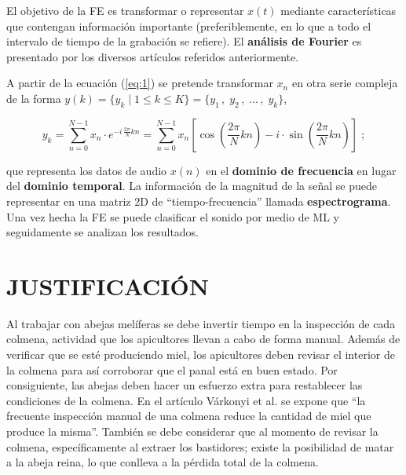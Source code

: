 \documentclass[12pt]{report}
\begin{document}
	\par El objetivo de la FE es transformar o representar $x(t)$ mediante características que contengan información importante (preferiblemente, en lo que a todo el intervalo de tiempo de la grabación se refiere)\cite{varkonyi2023dynamic}. El \textbf{análisis de Fourier} es presentado por los diversos artículos referidos anteriormente.
	
	\par A partir de la ecuación (\ref{eq:1}) se pretende transformar $x_n$ en otra serie compleja de la forma $y(k) = \{ y_k \; | \; 1 \le k \le K \} = \{ y_1 \, , \; y_2 \, , \; ... \, , \; y_k \}$,
	
	\begin{equation}\label{eq:1}
		y_k = \sum_{n = 0}^{N - 1} x_n \cdot e^{-i \, \frac{2 \pi}{N}kn} = \sum_{n = 0}^{N-1} x_n \left[ \cos{\left( \frac{2 \pi}{N} kn \right)} - i \cdot \sin{\left( \frac{2 \pi}{N} kn \right)} \right] \; ;
	\end{equation}
	
	que representa los datos de audio $x(n)$ en el \textbf{dominio de frecuencia} en lugar del \textbf{dominio temporal}. La información de la magnitud de la señal se puede representar en una matriz 2D de ``tiempo-frecuencia'' llamada \textbf{espectrograma}. Una vez hecha la FE se puede clasificar el sonido por medio de ML y seguidamente se analizan los resultados.
	
	
	
	
	
	\chapter{JUSTIFICACIÓN}
	
	Al trabajar con abejas melíferas se debe invertir tiempo en la inspección de cada colmena, actividad que los apicultores llevan a cabo de forma manual. Además de verificar que se esté produciendo miel, los apicultores deben revisar el interior de la colmena para así corroborar que el panal está en buen estado. Por consiguiente, las abejas deben hacer un esfuerzo extra para restablecer las condiciones de la colmena. En el artículo \cite{varkonyi2023dynamic} Várkonyi et al. se expone que ``la frecuente inspección manual de una colmena reduce la cantidad de miel que produce la misma''. También se debe considerar que al momento de revisar la colmena, específicamente al extraer los bastidores; existe la posibilidad de matar a la abeja reina, lo que conlleva a la pérdida total de la colmena.
	
\end{document}

